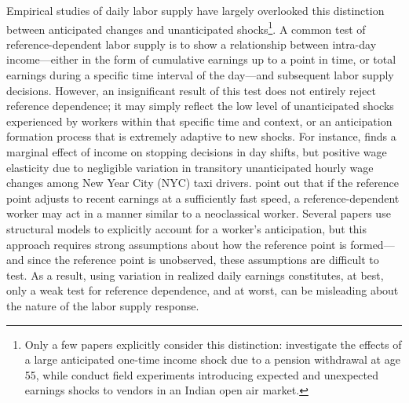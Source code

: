 \documentclass[reviewmode]{restat}
\begin{document}
Empirical studies of daily labor supply have largely overlooked this distinction between 
anticipated changes and unanticipated shocks\footnote{ Only a few papers explicitly consider this 
distinction: \citet{agarwal2017anticipated} investigate the effects of a large anticipated one-time 
income shock due to a pension withdrawal at age 55, while \citet{andersen2014toward} conduct field 
experiments  introducing expected and unexpected earnings shocks to vendors in an Indian 
open air market.}. A common test of reference-dependent labor supply is to show a relationship 
between intra-day income---either in the form of cumulative earnings up to a point in time, or 
total earnings during a specific time interval of the day---and subsequent labor supply decisions. 
However, an insignificant result of this test does not entirely reject reference dependence; it may 
simply reflect the low level of unanticipated shocks experienced by workers within that specific time 
and context, or an anticipation formation process that is extremely adaptive to new shocks. 
For instance, \citet{farber2015you} finds a marginal effect of income on stopping decisions in day 
shifts, but positive wage elasticity due to negligible variation in transitory unanticipated hourly 
wage changes among New Year City (NYC) taxi drivers. \citet{thakral2018daily} point out that if the 
reference point adjusts to recent earnings at a sufficiently fast speed, a reference-dependent worker 
may act in a manner similar to a neoclassical worker. Several papers use structural models to 
explicitly account for a worker's anticipation, but this approach requires strong assumptions about 
how the reference point is formed---and since the reference point is unobserved, these assumptions 
are difficult to test. As a result, using variation in realized daily earnings constitutes, at best, 
only a weak test for reference dependence, and at worst, can be misleading about the nature of the 
labor supply response.
\end{document}
